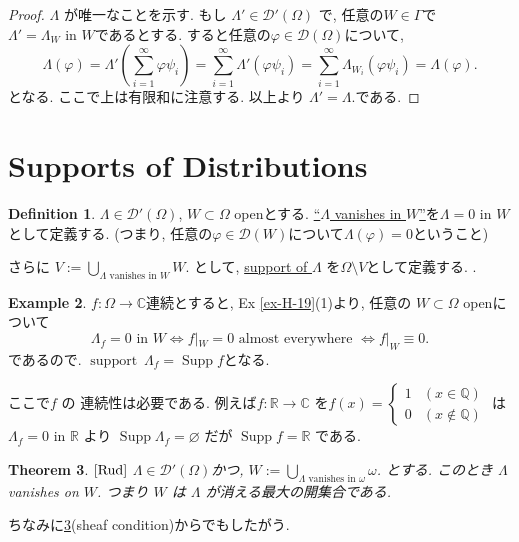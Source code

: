 \documentclass[dvipdfmx,a4paper,11pt]{article} %
\newtheorem{thm}{Theorem}[section]
\theoremstyle{definition}
\newtheorem{defn}[thm]{Definition}
\newtheorem{ex}[thm]{Example}
\theoremstyle{remark}
\numberwithin{equation}{section}
\begin{document}
\begin{proof}
\(\Lambda\) が唯一なことを示す. 
もし \(\Lambda' \in \mathcal{D}'(\Omega)\) で, 任意の$W \in \Gamma$で
 \(\Lambda' = \Lambda_W \text{ in } W \)であるとする. 
すると任意の\(\varphi \in \mathcal{D}(\Omega)\)について, 
\[
\Lambda(\varphi) = \Lambda'(\sum_{i=1}^\infty \varphi \psi_i) 
= \sum_{i=1}^\infty \Lambda'(\varphi \psi_i) 
= \sum_{i=1}^\infty \Lambda_{W_i}(\varphi \psi_i) = \Lambda(\varphi).
\]
となる. ここで上は有限和に注意する. 以上より
\(\Lambda' = \Lambda.\)である. 
\end{proof}


\section{Supports of Distributions}  

\begin{tcolorbox}[mybox]
\begin{defn}{\cite[Def 6.22]{Rud}}
\label{defn-H-22}
\(\Lambda \in \mathcal{D}'(\Omega)\), \(W \subset \Omega\) openとする. 
 \underline{“\(\Lambda\) vanishes in \(W\)”}を\(\Lambda = 0 \text{ in } W\)として定義する.   
(つまり, 任意の$\varphi \in \mathcal{D}(W)$について\(\Lambda(\varphi) = 0\)ということ)  

さらに
\(V := \bigcup_{\Lambda \text{ vanishes in } W} W\).  
として, \underline{support of \(\Lambda\)} を\(\Omega \setminus V\)として定義する. .  
\end{defn}
\end{tcolorbox}

\begin{ex}
\label{ex-H-23}
\(f: \Omega \to \mathbb{C}\)連続とすると, 
Ex \ref{ex-H-19}(1)より, 任意の \(W \subset \Omega\) openについて
\[
\Lambda_f = 0 \text{ in } W \iff f|_W = 0 \text{ almost everywhere } \iff f|_W \equiv 0.
\]
であるので. \( \operatorname{support} \ \Lambda_f = \operatorname{Supp} f \)となる. 

ここで\(f\) の 連続性は必要である. 
例えば\(f:\mathbb{R} \to \mathbb{C}\) を\(f(x) = \begin{cases}1 & (x \in \mathbb{Q}) \\ 0 & (x \notin \mathbb{Q})\end{cases}\) は  
\(\Lambda_f = 0 \text{ in } \mathbb{R}\) より \(\operatorname{Supp} \Lambda_f = \varnothing\) だが \(\operatorname{Supp} f = \mathbb{R}\) である. 
\end{ex}

\begin{tcolorbox}[mybox]
\begin{thm}{$\cite[Thm 6.23]{Rud}$}
\label{thm-H-24}
\(\Lambda \in \mathcal{D}'(\Omega)\)かつ, \(W := \bigcup_{\Lambda \text{ vanishes in } \omega} \omega\).  
とする. 
このとき \(\Lambda\) vanishes on \(W\).  つまり \(W\) は \(\Lambda\) が消える最大の開集合である.
\end{thm}
\end{tcolorbox}
ちなみに\ref{thm-H-24}(sheaf condition)からでもしたがう.
\end{document}
